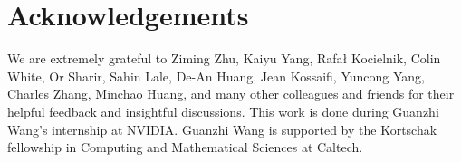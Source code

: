 \section{Acknowledgements}
We are extremely grateful to Ziming Zhu, Kaiyu Yang, Rafał Kocielnik, Colin White, Or Sharir, Sahin Lale, De-An Huang, Jean Kossaifi, Yuncong Yang, Charles Zhang, Minchao Huang, and many other colleagues and friends for their helpful feedback and insightful discussions. This work is done during Guanzhi Wang’s internship at NVIDIA. Guanzhi Wang is supported by the Kortschak fellowship in Computing and Mathematical Sciences at Caltech.